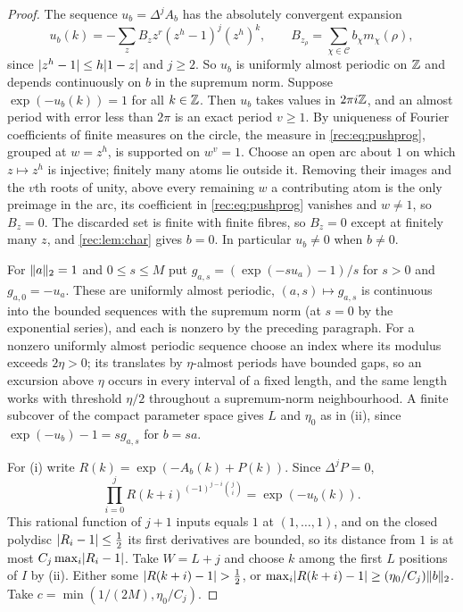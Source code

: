 \begin{proof}
The sequence $u_b=\Delta^jA_b$ has the absolutely convergent expansion
\begin{equation}\label{rec:eq:pushprog}
 u_b(k)=-\sum_zB_zz^r(z^h-1)^j(z^h)^k,\qquad B_{z_\rho}=\sum_{\chi\in\mathcal C}b_\chi m_\chi(\rho),
\end{equation}
since $\lvert z^h-1\rvert\le h\lvert1-z\rvert$ and $j\ge2$. So $u_b$ is uniformly almost periodic on $\mathbb{Z}$ and depends continuously
on $b$ in the supremum norm. Suppose $\exp(-u_b(k))=1$ for all $k\in\mathbb{Z}$. Then $u_b$ takes values in $2\pi i\mathbb{Z}$, and an
almost period with error less than $2\pi$ is an exact period $v\ge1$. By uniqueness of Fourier coefficients of
finite measures on the circle, the measure in \eqref{rec:eq:pushprog}, grouped at $w=z^h$, is supported on $w^v=1$.
Choose an open arc about $1$ on which $z\mapsto z^h$ is injective; finitely many atoms lie outside it. Removing
their images and the $v$th roots of unity, above every remaining $w$ a contributing atom is the only preimage in the
arc, its coefficient in \eqref{rec:eq:pushprog} vanishes and $w\ne1$, so $B_z=0$. The discarded set is finite with finite
fibres, so $B_z=0$ except at finitely many $z$, and \cref{rec:lem:char} gives $b=0$. In particular $u_b\ne0$ when $b\ne0$.

For $\lVert a\rVert_2=1$ and $0\le s\le M$ put $g_{a,s}=(\exp(-su_a)-1)/s$ for $s>0$ and $g_{a,0}=-u_a$. These are uniformly almost
periodic, $(a,s)\mapsto g_{a,s}$ is continuous into the bounded sequences with the supremum norm (at $s=0$ by the
exponential series), and each is nonzero by the preceding paragraph. For a nonzero uniformly almost periodic
sequence choose an index where its modulus exceeds $2\eta>0$; its translates by $\eta$-almost periods have bounded
gaps, so an excursion above $\eta$ occurs in every interval of a fixed length, and the same length works with
threshold $\eta/2$ throughout a supremum-norm neighbourhood. A finite subcover of the compact parameter space gives
$L$ and $\eta_0$ as in (ii), since $\exp(-u_b)-1=sg_{a,s}$ for $b=sa$.

For (i) write $R(k)=\exp(-A_b(k)+P(k))$. Since $\Delta^jP=0$,
\[
 \prod_{i=0}^jR(k+i)^{(-1)^{j-i}\binom ji}=\exp(-u_b(k)).
\]
This rational function of $j+1$ inputs equals $1$ at
$(1,\dots,1)$, and on the closed polydisc $\lvert R_i-1\rvert\le\frac12$ its first derivatives are bounded, so its distance from
$1$ is at most $C_j\max_i\lvert R_i-1\rvert$. Take $W=L+j$ and choose $k$ among the first $L$ positions of $I$ by (ii). Either some
$\lvert R(k+i)-1\rvert>\frac12$, or $\max_i\lvert R(k+i)-1\rvert\ge(\eta_0/C_j)\lVert b\rVert_2$. Take $c=\min(1/(2M),\eta_0/C_j)$.
\end{proof}

